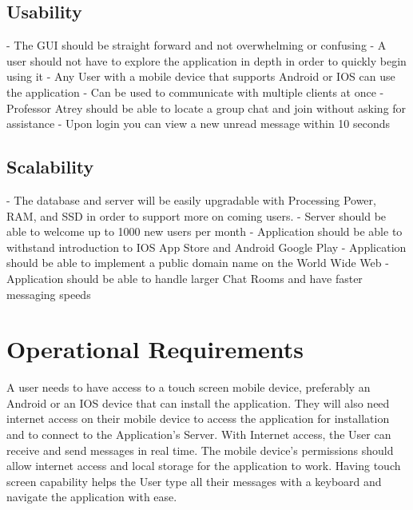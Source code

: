 \documentclass[11pt]{article}
\theoremstyle{plain}
\theoremstyle{definition}
\begin{document}
\subsection{Usability}
- The GUI should be straight forward and not overwhelming or confusing  \newline
- A user should not have to explore the application in depth in order to quickly begin using it  \newline
- Any User with a mobile device that supports Android or IOS can use the application \newline
- Can be used to communicate with multiple clients at once \newline
- Professor Atrey should be able to locate a group chat and join without asking for assistance \newline
- Upon login you can view a new unread message within 10 seconds \newline


\subsection{Scalability}
- The database and server will be easily upgradable with Processing Power, RAM, and SSD in order to support more on coming users.   \newline
- Server should be able to welcome up to 1000 new users per month \newline
- Application should be able to withstand introduction to IOS App Store and Android Google Play \newline
- Application should be able to implement a public domain name on the World Wide Web \newline
- Application should be able to handle larger Chat Rooms and have faster messaging speeds \newline


\section{Operational Requirements}\label{sec:operationalrequirements}
A user needs to have access to a touch screen mobile device, preferably an Android or an IOS device that can install the application. They will also need  internet access on their mobile device to access the application for installation and to connect to the Application's Server. With Internet access, the User can receive and send messages in real time. The mobile device’s permissions should allow internet access and local storage for the application to work. Having touch screen capability helps the User type all their messages with a keyboard and navigate the application with ease.
\end{document}
